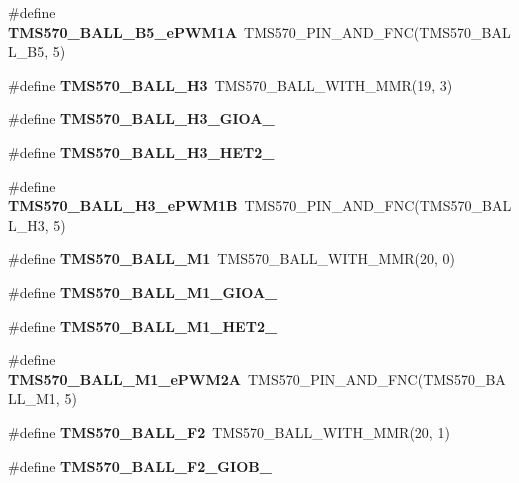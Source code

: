 \begin{DoxyCompactItemize}
\item 
\mbox{\label{tms570lc4357-pins_8h_a202dc52f345957a4b626cf7b352350ad}} 
\#define {\bfseries T\+M\+S570\+\_\+\+B\+A\+L\+L\+\_\+\+B5\+\_\+e\+P\+W\+M1A}~T\+M\+S570\+\_\+\+P\+I\+N\+\_\+\+A\+N\+D\+\_\+\+F\+NC(T\+M\+S570\+\_\+\+B\+A\+L\+L\+\_\+\+B5, 5)
\item 
\mbox{\label{tms570lc4357-pins_8h_ac363b9371a1109af1c8cbb8f7bfe0bf4}} 
\#define {\bfseries T\+M\+S570\+\_\+\+B\+A\+L\+L\+\_\+\+H3}~T\+M\+S570\+\_\+\+B\+A\+L\+L\+\_\+\+W\+I\+T\+H\+\_\+\+M\+MR(19, 3)
\item 
\#define {\bfseries T\+M\+S570\+\_\+\+B\+A\+L\+L\+\_\+\+H3\+\_\+\+G\+I\+O\+A\+\_}
\item 
\#define {\bfseries T\+M\+S570\+\_\+\+B\+A\+L\+L\+\_\+\+H3\+\_\+\+H\+E\+T2\+\_}
\item 
\mbox{\label{tms570lc4357-pins_8h_a02020e8d3b1160d2431b968f519877bf}} 
\#define {\bfseries T\+M\+S570\+\_\+\+B\+A\+L\+L\+\_\+\+H3\+\_\+e\+P\+W\+M1B}~T\+M\+S570\+\_\+\+P\+I\+N\+\_\+\+A\+N\+D\+\_\+\+F\+NC(T\+M\+S570\+\_\+\+B\+A\+L\+L\+\_\+\+H3, 5)
\item 
\mbox{\label{tms570lc4357-pins_8h_ab4f030496ff76318c357b877deadfc84}} 
\#define {\bfseries T\+M\+S570\+\_\+\+B\+A\+L\+L\+\_\+\+M1}~T\+M\+S570\+\_\+\+B\+A\+L\+L\+\_\+\+W\+I\+T\+H\+\_\+\+M\+MR(20, 0)
\item 
\#define {\bfseries T\+M\+S570\+\_\+\+B\+A\+L\+L\+\_\+\+M1\+\_\+\+G\+I\+O\+A\+\_}
\item 
\#define {\bfseries T\+M\+S570\+\_\+\+B\+A\+L\+L\+\_\+\+M1\+\_\+\+H\+E\+T2\+\_}
\item 
\mbox{\label{tms570lc4357-pins_8h_a99dfad576e583d51b8d4061d0df26434}} 
\#define {\bfseries T\+M\+S570\+\_\+\+B\+A\+L\+L\+\_\+\+M1\+\_\+e\+P\+W\+M2A}~T\+M\+S570\+\_\+\+P\+I\+N\+\_\+\+A\+N\+D\+\_\+\+F\+NC(T\+M\+S570\+\_\+\+B\+A\+L\+L\+\_\+\+M1, 5)
\item 
\mbox{\label{tms570lc4357-pins_8h_adf9d37c2c8fa14695c7645c703bb8697}} 
\#define {\bfseries T\+M\+S570\+\_\+\+B\+A\+L\+L\+\_\+\+F2}~T\+M\+S570\+\_\+\+B\+A\+L\+L\+\_\+\+W\+I\+T\+H\+\_\+\+M\+MR(20, 1)
\item 
\#define {\bfseries T\+M\+S570\+\_\+\+B\+A\+L\+L\+\_\+\+F2\+\_\+\+G\+I\+O\+B\+\_}

\end{DoxyCompactItemize}
